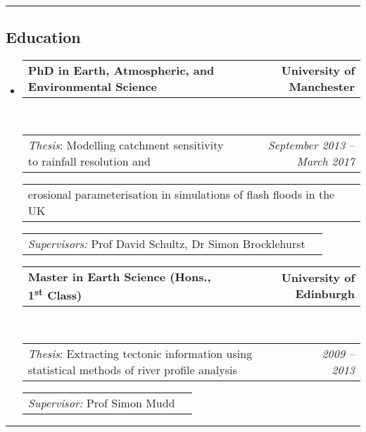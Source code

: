 \documentclass[10.5pt,a4]{article}
\makeatletter
\newcommand{\headerrow}[2]
{\begin{tabular*}{\linewidth}{l@{\extracolsep{\fill}}r}
	#1 &
	#2 \\
\end{tabular*}}
\makeatother
\begin{document}
\hrule
\vspace{-0.4em}
\subsection*{Education}
\begin{itemize}
	\parskip=0.1em
	
	\item 
	\headerrow
		{\textbf{PhD in Earth, Atmospheric, and Environmental Science}}
		{\textbf{University of Manchester}}
	\\
	\headerrow
		{\emph{Thesis}: Modelling catchment sensitivity to rainfall resolution and}
		{\emph{September 2013 -- March 2017}}
	\headerrow
		{\hspace{10mm} erosional parameterisation in simulations of flash floods in the UK}
		{}
  \headerrow
    {\emph{Supervisors:} Prof David Schultz, Dr Simon Brocklehurst}
  
	\item 
	\headerrow
		{\textbf{Master in Earth Science (Hons., 1\textsuperscript{st} Class)} }
		{\textbf{University of Edinburgh}}
	\\
	\headerrow
		{\emph{Thesis}: Extracting tectonic information using statistical methods of river profile analysis}
		{\emph{2009 -- 2013}}
	\headerrow
    {\emph{Supervisor:} Prof Simon Mudd} 
    {}
\end{itemize}

\hrule
\vspace{-0.4em}
\end{document}
